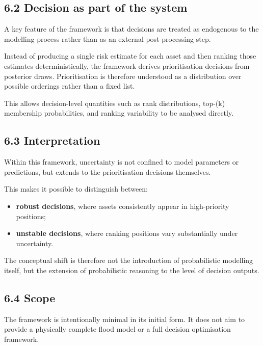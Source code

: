 \documentclass[
]{article}
\providecommand{\tightlist}{%
  \setlength{\itemsep}{0pt}\setlength{\parskip}{0pt}}
\begin{document}
\subsection{6.2 Decision as part of the
system}\label{decision-as-part-of-the-system}

A key feature of the framework is that decisions are treated as
endogenous to the modelling process rather than as an external
post-processing step.

Instead of producing a single risk estimate for each asset and then
ranking those estimates deterministically, the framework derives
prioritisation decisions from posterior draws. Prioritisation is
therefore understood as a distribution over possible orderings rather
than a fixed list.

This allows decision-level quantities such as rank distributions,
top-(k) membership probabilities, and ranking variability to be analysed
directly.

\subsection{6.3 Interpretation}\label{interpretation}

Within this framework, uncertainty is not confined to model parameters
or predictions, but extends to the prioritisation decisions themselves.

This makes it possible to distinguish between:

\begin{itemize}
\tightlist
\item
  \textbf{robust decisions}, where assets consistently appear in
  high-priority positions;
\item
  \textbf{unstable decisions}, where ranking positions vary
  substantially under uncertainty.
\end{itemize}

The conceptual shift is therefore not the introduction of probabilistic
modelling itself, but the extension of probabilistic reasoning to the
level of decision outputs.

\subsection{6.4 Scope}\label{scope}

The framework is intentionally minimal in its initial form. It does not
aim to provide a physically complete flood model or a full decision
optimisation framework.
\end{document}
